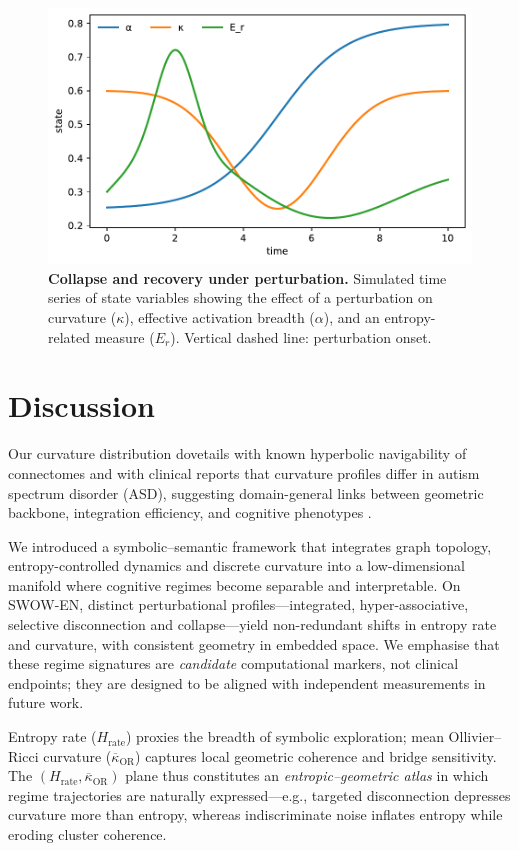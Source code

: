 \documentclass[fleqn,10pt]{wlscirep}
\begin{document}
\begin{figure}[htbp]\centering
\includegraphics[width=\linewidth]{Fig_collapse_recovery.pdf}
\caption{\textbf{Collapse and recovery under perturbation.} Simulated time series of state variables showing the effect of a perturbation on curvature ($\kappa$), effective activation breadth ($\alpha$), and an entropy-related measure ($E_r$). Vertical dashed line: perturbation onset.}
\label{fig:collapse}
\end{figure}

\section*{Discussion}
Our curvature distribution dovetails with known hyperbolic navigability of connectomes \citep{Allard2020PLOSCB} and with clinical reports that curvature profiles differ in autism spectrum disorder (ASD), suggesting domain-general links between geometric backbone, integration efficiency, and cognitive phenotypes \citep{Elumalai2022SciRep,Simhal2020SciRep}.

We introduced a symbolic--semantic framework that integrates graph topology, entropy-controlled dynamics and discrete curvature into a low-dimensional manifold where cognitive regimes become separable and interpretable. On SWOW-EN, distinct perturbational profiles---integrated, hyper-associative, selective disconnection and collapse---yield non-redundant shifts in entropy rate and curvature, with consistent geometry in embedded space. We emphasise that these regime signatures are \emph{candidate} computational markers, not clinical endpoints; they are designed to be aligned with independent measurements in future work.

Entropy rate ($H_{\mathrm{rate}}$) proxies the breadth of symbolic exploration; mean Ollivier--Ricci curvature ($\overline{\kappa}_{\mathrm{OR}}$) captures local geometric coherence and bridge sensitivity. The $(H_{\mathrm{rate}},\overline{\kappa}_{\mathrm{OR}})$ plane thus constitutes an \emph{entropic--geometric atlas} in which regime trajectories are naturally expressed---e.g., targeted disconnection depresses curvature more than entropy, whereas indiscriminate noise inflates entropy while eroding cluster coherence.
\end{document}
